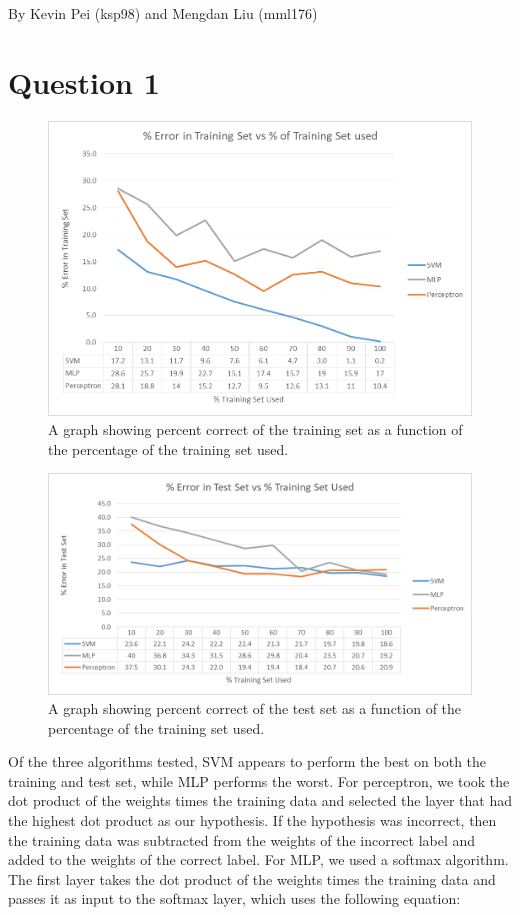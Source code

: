 \documentclass[12pt]{article}
\begin{document}
By Kevin Pei (ksp98) and Mengdan Liu (mml176)

\section*{Question 1}

\begin{figure}[H]
    \centering
    \includegraphics[width=1\textwidth]{question_1_3}
    \caption{A graph showing percent correct of the training set as a function of the percentage of the training set used.}
    \label{fig:question_1_3}
\end{figure}

\begin{figure}[H]
    \centering
    \includegraphics[width=1\textwidth]{question_1_4}
    \caption{A graph showing percent correct of the test set as a function of the percentage of the training set used.}
    \label{fig:question_1_4}
\end{figure}

Of the three algorithms tested, SVM appears to perform the best on both the training and test set, while MLP performs the worst. For perceptron, we took the dot product of the weights times the training data and selected the layer that had the highest dot product as our hypothesis. If the hypothesis was incorrect, then the training data was subtracted from the weights of the incorrect label and added to the weights of the correct label. For MLP, we used a softmax algorithm. The first layer takes the dot product of the weights times the training data and passes it as input to the softmax layer, which uses the following equation:
\end{document}
